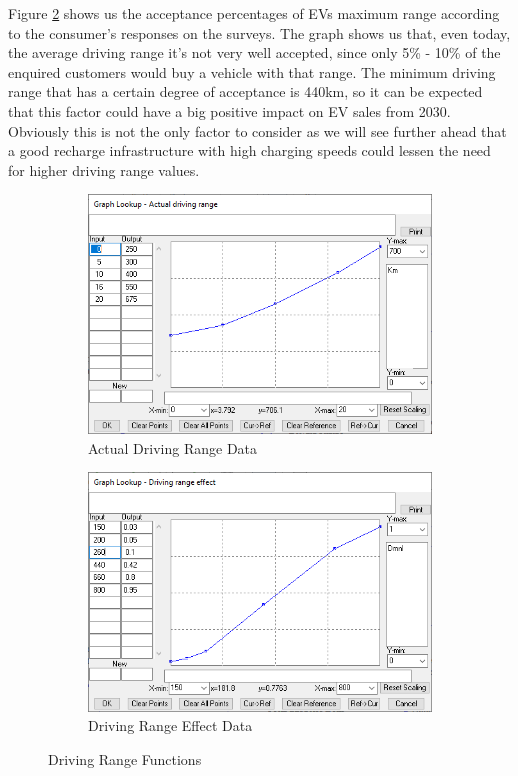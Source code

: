 Figure \ref{fig:driving-range-effect} shows us the acceptance percentages of EVs maximum range according to the consumer's responses on the surveys. The graph shows us that, even today, the average driving range it's not very well accepted, since only 5\% - 10\% of the enquired customers would buy a vehicle with that range. The minimum driving range that has a certain degree of acceptance is 440km, so it can be expected that this factor could have a big positive impact on EV sales from 2030. Obviously this is not the only factor to consider as we will see further ahead that a good recharge infrastructure with high charging speeds could lessen the need for higher driving range values.

\vspace{2cm}

\begin{figure}[htbp]
\centering
\begin{subfigure}{0.5\textwidth}
  \centering
  \includegraphics[width=0.98\linewidth]{img/driving-range.png}
  \caption{Actual Driving Range Data}
  \label{fig:driving-range}
\end{subfigure}%
\begin{subfigure}{0.5\textwidth}
  \centering
  \includegraphics[width=0.98\linewidth]{img/driving-range-effect.png}
  \caption{Driving Range Effect Data}
  \label{fig:driving-range-effect}
\end{subfigure}
\caption{Driving Range Functions}
\label{fig:driving-range-funcs}
\end{figure}

